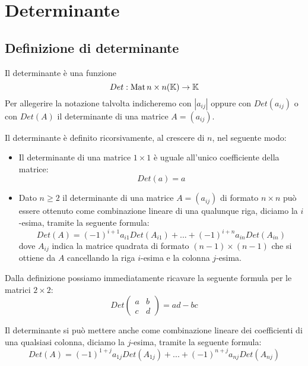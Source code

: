 \chapter{Determinante}
\section{Definizione di determinante}
Il determinante è una funzione
\[
	Det : \operatorname{Mat}{n \times n}(\mathbb{K}) \to \mathbb{K}
\]
Per allegerire la notazione talvolta indicheremo con $|a_{ij}|$ oppure con
$Det(a_{ij})$ o con $Det(A)$ il determinante di una matrice $A = (a_{ij})$.

Il determinante è definito ricorsivamente, al crescere di $n$, nel seguente
modo:
\begin{itemize}
	\item Il determinante di una matrice $1 \times 1$ è uguale all'unico
	      coefficiente della matrice:
	      \[
		      Det(a) = a
	      \]
	\item Dato $n \geq 2$ il determinante di una matrice $A = (a_{ij})$ di
	      formato $n \times n$ può essere ottenuto come combinazione lineare
	      di una qualunque riga, diciamo la $i$-esima, tramite la seguente
	      formula:
	      \[
		      Det(A) = (-1)^{i + 1}a_{i1}Det(A_{i1}) + ... +
		      (-1)^{i + n}a_{in}Det(A_{in})
	      \]
	      dove $A_{ij}$ indica la matrice quadrata di formato
	      $(n - 1) \times (n - 1)$ che si ottiene da $A$ cancellando la riga
	      $i$-esima e la colonna $j$-esima.
\end{itemize}

\begin{observation}
	Dalla definizione possiamo immediatamente ricavare la seguente formula
	per le matrici $2 \times 2$:
	\[
		Det \begin{pmatrix}
			a & b \\
			c & d
		\end{pmatrix} =
		ad - bc
	\]
\end{observation}

\begin{observation}
	Il determinante si può mettere anche come combinazione lineare dei
	coefficienti di una qualsiasi colonna, diciamo la $j$-esima, tramite
	la seguente formula:
	\[
		Det(A) = (-1)^{1 + j}a_{1j}Det(A_{1j}) + ... +
		(-1)^{n + j}a_{nj}Det(A_{nj})
	\]
\end{observation}

